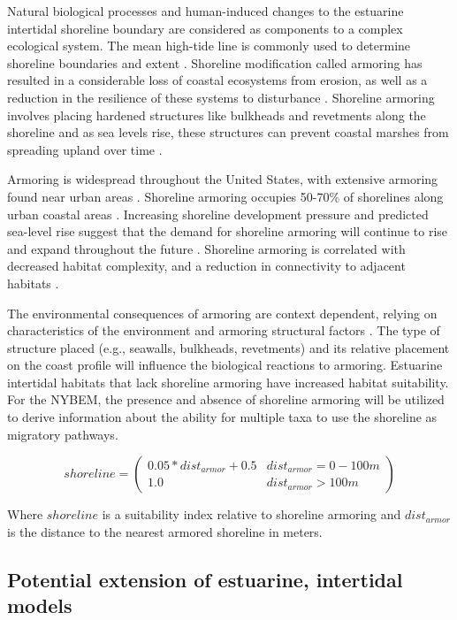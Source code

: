 \documentclass[
]{book}
\begin{document}
Natural biological processes and human-induced changes to the estuarine intertidal shoreline boundary are considered as components to a complex ecological system. The mean high-tide line is commonly used to determine shoreline boundaries and extent \citep{kittinger_shoreline_2010}. Shoreline modification called armoring has resulted in a considerable loss of coastal ecosystems from erosion, as well as a reduction in the resilience of these systems to disturbance \citep{kittinger_shoreline_2010}. Shoreline armoring involves placing hardened structures like bulkheads and revetments along the shoreline and as sea levels rise, these structures can prevent coastal marshes from spreading upland over time \citep{gardner_is_2021}.

Armoring is widespread throughout the United States, with extensive armoring found near urban areas \citep{morley_ecological_2012}. Shoreline armoring occupies 50-70\% of shorelines along urban coastal areas \citep{dugan_generalizing_2018}. Increasing shoreline development pressure and predicted sea-level rise suggest that the demand for shoreline armoring will continue to rise and expand throughout the future \citep{gardner_is_2021}. Shoreline armoring is correlated with decreased habitat complexity, and a reduction in connectivity to adjacent habitats \citep{morley_ecological_2012}.

The environmental consequences of armoring are context dependent, relying on characteristics of the environment and armoring structural factors \citep{dugan_generalizing_2018}. The type of structure placed (e.g., seawalls, bulkheads, revetments) and its relative placement on the coast profile will influence the biological reactions to armoring. Estuarine intertidal habitats that lack shoreline armoring have increased habitat suitability. For the NYBEM, the presence and absence of shoreline armoring will be utilized to derive information about the ability for multiple taxa to use the shoreline as migratory pathways.

\[shoreline = \begin{pmatrix} 0.05*dist_{armor}+0.5 & dist_{armor}=0-100m\\
1.0 & dist_{armor}>100m
\end{pmatrix}\]

Where \(shoreline\) is a suitability index relative to shoreline armoring and \(dist_{armor}\) is the distance to the nearest armored shoreline in meters.

\hypertarget{potential-extension-of-estuarine-intertidal-models}{%
\subsection{Potential extension of estuarine, intertidal models}\label{potential-extension-of-estuarine-intertidal-models}}
\end{document}
